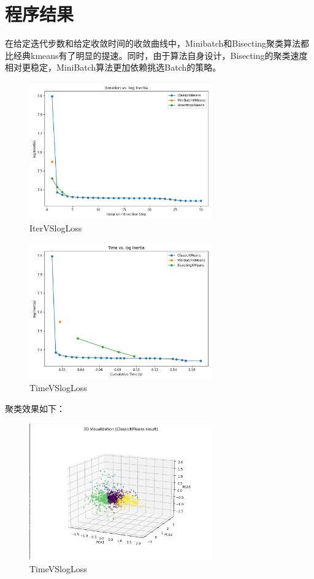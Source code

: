 \documentclass[12pt]{article}  %
\begin{document}
\section{程序结果}
在给定迭代步数和给定收敛时间的收敛曲线中，Minibatch和Bisecting聚类算法都比经典kmeans有了明显的提速。同时，由于算法自身设计，Bisecting的聚类速度相对更稳定，MiniBatch算法更加依赖挑选Batch的策略。
\begin{figure}[H]
  \centering
  \includegraphics[width=0.7\textwidth]{kmeansII_IterVSlogLoss.png} %
  \caption{IterVSlogLoss}
\end{figure}

\begin{figure}[H]
  \centering
  \includegraphics[width=0.7\textwidth]{kmeansII_TimeVSlogLoss.png} %
  \caption{TimeVSlogLoss}
\end{figure}


聚类效果如下：
\begin{figure}[htbp]
  \centering
  \includegraphics[width=0.7\textwidth]{kmeansII_PCA.png} %
  \caption{TimeVSlogLoss}
\end{figure}
\end{document}
